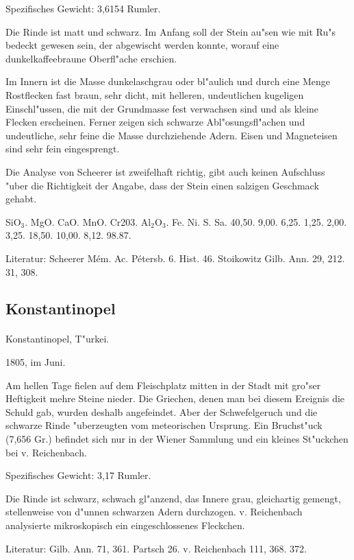 \documentclass[a4paper, 11pt, oneside]{article}
\begin{document}
Spezifisches Gewicht: 3,6154 Rumler.

Die Rinde ist matt und schwarz. Im Anfang soll der Stein au"sen wie mit Ru"s bedeckt gewesen sein, der abgewischt werden konnte, worauf eine dunkelkaffeebraune Oberfl"ache erschien.

Im Innern ist die Masse dunkelaschgrau oder bl"aulich und durch eine Menge Rostflecken fast braun, sehr dicht, mit helleren, undeutlichen kugeligen Einschl"ussen, die mit der Grundmasse fest verwachsen sind und als kleine Flecken erscheinen. Ferner zeigen sich schwarze Abl"osungsfl"achen und undeutliche, sehr feine die Masse durchziehende Adern. Eisen und Magneteisen sind sehr fein eingesprengt.

Die Analyse von Scheerer ist zweifelhaft richtig, gibt auch keinen Aufschluss "uber die Richtigkeit der Angabe, dass der Stein einen salzigen Geschmack gehabt.

SiO$_{3}$. MgO. CaO. MnO. Cr203. Al$_{2}$O$_{3}$. Fe. Ni. S. Sa.  
40,50. 9,00. 6,25. 1,25. 2,00. 3,25. 18,50. 10,00. 8,12. 98.87.

Literatur: Scheerer Mém. Ac. Pétersb. 6. Hist. 46. Stoikowitz Gilb. Ann. 29, 212. 31, 308.

\subsection{Konstantinopel}
\normalsize
\paragraph{}
Konstantinopel, T"urkei.

1805, im Juni.

Am hellen Tage fielen auf dem Fleischplatz mitten in der Stadt mit gro"ser Heftigkeit mehre Steine nieder. Die Griechen, denen man bei diesem Ereignis die Schuld gab, wurden deshalb angefeindet. Aber der Schwefelgeruch und die schwarze Rinde "uberzeugten vom meteorischen Ursprung. Ein Bruchst"uck (7,656 Gr.) befindet sich nur in der Wiener Sammlung und ein kleines St"uckchen bei v. Reichenbach.

Spezifisches Gewicht: 3,17 Rumler.

Die Rinde ist schwarz, schwach gl"anzend, das Innere grau, gleichartig gemengt, stellenweise von d"unnen schwarzen Adern durchzogen. v. Reichenbach analysierte mikroskopisch ein eingeschlossenes Fleckchen.

Literatur: Gilb. Ann. 71, 361. Partsch 26. v. Reichenbach 111, 368. 372.
\end{document}
